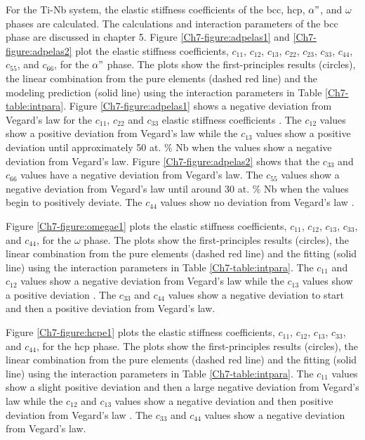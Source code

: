For the Ti-Nb system, the elastic stiffness coefficients of the bcc, hcp, $\alpha"$, and $\omega$ phases are calculated. The calculations and interaction parameters of the bcc phase are discussed in chapter 5. Figure \ref{Ch7-figure:adpelas1} and \ref{Ch7-figure:adpelas2} plot the elastic stiffness coefficients, $c_{11}$, $c_{12}$, $c_{13}$, $c_{22}$, $c_{23}$, $c_{33}$, $c_{44}$, $c_{55}$, and $c_{66}$, for the $\alpha"$ phase. The plots show the first-principles results (circles), the linear combination from the pure elements (dashed red line) and the modeling prediction (solid line) using the interaction parameters in Table \ref{Ch7-table:intpara}. Figure \ref{Ch7-figure:adpelas1} shows a negative deviation from Vegard's law for the $c_{11}$, $c_{22}$ and $c_{33}$ elastic stiffness coefficients \cite{Denton1991}. The $c_{12}$ values show a positive deviation from Vegard's law while the $c_{13}$ values show a positive deviation until approximately 50 at. \% Nb when the values show a negative deviation from Vegard's law. Figure \ref{Ch7-figure:adpelas2} shows that the $c_{33}$ and $c_{66}$ values have a negative deviation from Vegard's law. The $c_{55}$ values show a negative deviation from Vegard's law until around 30 at. \% Nb when the values begin to positively deviate. The $c_{44}$ values show no deviation from Vegard's law \cite{Denton1991}.

Figure \ref{Ch7-figure:omegae1} plots the elastic stiffness coefficients, $c_{11}$, $c_{12}$, $c_{13}$, $c_{33}$, and $c_{44}$, for the $\omega$ phase. The plots show the first-principles results (circles), the linear combination from the pure elements (dashed red line) and the fitting (solid line) using the interaction parameters in Table \ref{Ch7-table:intpara}. The $c_{11}$ and $c_{12}$ values show a negative deviation from Vegard's law while the $c_{13}$ values show a positive deviation \cite{Denton1991}. The $c_{33}$ and $c_{44}$ values show a negative deviation to start and then a positive deviation from Vegard's law. 

Figure \ref{Ch7-figure:hcpe1} plots the elastic stiffness coefficients, $c_{11}$, $c_{12}$, $c_{13}$, $c_{33}$, and $c_{44}$, for the hcp phase. The plots show the first-principles results (circles), the linear combination from the pure elements (dashed red line) and the fitting (solid line) using the interaction parameters in Table \ref{Ch7-table:intpara}. The $c_{11}$ values show a slight positive deviation and then a large negative deviation from Vegard's law while the $c_{12}$ and $c_{13}$ values show a negative deviation and then positive deviation from Vegard's law \cite{Denton1991}. The $c_{33}$ and $c_{44}$ values show a negative deviation from Vegard's law.


